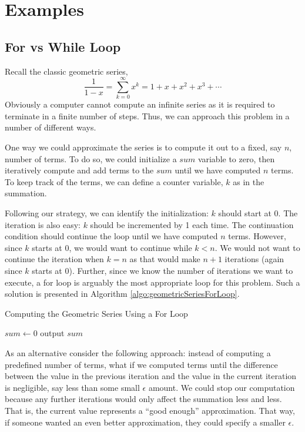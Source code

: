\section{Examples}

\subsection{For vs While Loop}

Recall the classic geometric series, 
  $$\frac{1}{1-x} = \sum_{k=0}^\infty x^k = 1 + x + x^2 + x^3 + \cdots$$
Obviously a computer cannot compute an infinite series as it is required to 
terminate in a finite number of steps.  Thus, we can approach this problem in
a number of different ways.  

One way we could approximate the series is to compute it out to a fixed, say $n$, 
number of terms.  To do so, we could initialize a $sum$ variable to zero, then 
iteratively compute and add terms to the $sum$ until we have computed $n$ 
terms.  To keep track of the terms, we can define a counter variable, $k$ as in 
the summation.  

Following our strategy, we can identify the initialization: $k$ should start at $0$.
The iteration is also easy: $k$ should be incremented by 1 each time.  The 
continuation condition should continue the loop until we have computed $n$ terms.
However, since $k$ starts at 0, we would want to continue while $k < n$.  We
would not want to continue the iteration when $k = n$ as that would make $n + 1$
iterations (again since $k$ starts at 0).  Further, since we know the number of
iterations we want to execute, a for loop is arguably the most appropriate loop
for this problem.  Such a solution is presented in Algorithm \ref{algo:geometricSeriesForLoop}.

\begin{algorithm}[h]
\caption{Computing the Geometric Series Using a For Loop}
\label{algo:geometricSeriesForLoop}
$sum \leftarrow 0$ \;
output $sum$ \;
\end{algorithm}

As an alternative consider the following approach: instead of computing a 
predefined number of terms, what if we computed terms until the difference
between the value in the previous iteration and the value in the current 
iteration is negligible, say less than some small $\epsilon$ amount.  We could
stop our computation because any further iterations would only affect the 
summation less and less.  That is, the current value represents a ``good
enough'' approximation.  That way, if someone wanted an even better
approximation, they could specify a smaller $\epsilon$.

